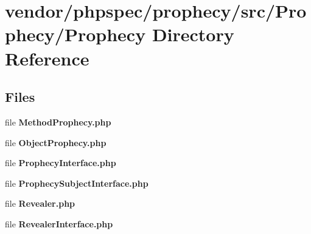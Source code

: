 \section{vendor/phpspec/prophecy/src/\+Prophecy/\+Prophecy Directory Reference}
\label{dir_4f9972390600c08406b92cf4edee28ba}
\subsection*{Files}
\begin{DoxyCompactItemize}
\item 
file {\bf Method\+Prophecy.\+php}
\item 
file {\bf Object\+Prophecy.\+php}
\item 
file {\bf Prophecy\+Interface.\+php}
\item 
file {\bf Prophecy\+Subject\+Interface.\+php}
\item 
file {\bf Revealer.\+php}
\item 
file {\bf Revealer\+Interface.\+php}
\end{DoxyCompactItemize}
